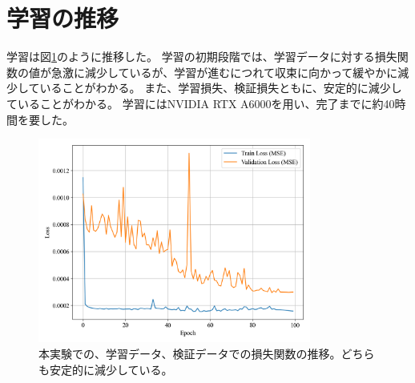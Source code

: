   \section{学習の推移}
  学習は図\ref{fig:exp2_learn_progress}のように推移した。
  学習の初期段階では、学習データに対する損失関数の値が急激に減少しているが、学習が進むにつれて収束に向かって緩やかに減少していることがわかる。
  また、学習損失、検証損失ともに、安定的に減少していることがわかる。
  学習にはNVIDIA RTX A6000を用い、完了までに約40時間を要した。
  \begin{figure}[htbp]
    \centering
    \includegraphics[width=0.8\textwidth]{figures/exp1/loss.png}
    \caption{本実験での、学習データ、検証データでの損失関数の推移。どちらも安定的に減少している。}
    \label{fig:exp2_learn_progress}
  \end{figure}

